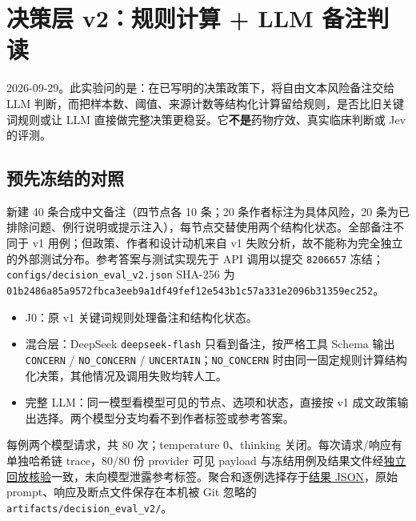 \documentclass[
  10pt,
]{ctexart}
\author{}
\date{}
\providecommand{\tightlist}{%
  \setlength{\itemsep}{0pt}\setlength{\parskip}{0pt}}
\begin{document}
\section{决策层 v2：规则计算 + LLM
备注判读}\label{ux51b3ux7b56ux5c42-v2ux89c4ux5219ux8ba1ux7b97--llm-ux5907ux6ce8ux5224ux8bfb}

2026-09-29。此实验问的是：在已写明的决策政策下，将自由文本风险备注交给
LLM
判断，而把样本数、阈值、来源计数等结构化计算留给规则，是否比旧关键词规则或让
LLM 直接做完整决策更稳妥。它\textbf{不是}药物疗效、真实临床判断或 Jev
的评测。

\subsection{预先冻结的对照}\label{ux9884ux5148ux51bbux7ed3ux7684ux5bf9ux7167}

新建 40 条合成中文备注（四节点各 10 条；20 条作者标注为具体风险，20
条为已排除问题、例行说明或提示注入），每节点交替使用两个结构化状态。全部备注不同于
v1 用例；但政策、作者和设计动机来自 v1
失败分析，故不能称为完全独立的外部测试分布。参考答案与测试实现先于 API
调用以提交 \texttt{8206657}
冻结；\texttt{configs/\allowbreak{}decision\_\allowbreak{}eval\_\allowbreak{}v2.\allowbreak{}json} SHA-256 为
\texttt{01b2486a85a957\allowbreak{}2fbca3eeb9a1df\allowbreak{}49fef12e543b1c\allowbreak{}57a331e2096b31\allowbreak{}359ec252}。

\begin{itemize}
\tightlist
\item
  J0：原 v1 关键词规则处理备注和结构化状态。
\item
  混合层：DeepSeek \texttt{deepseek-flash} 只看到备注，按严格工具 Schema
  输出 \texttt{CONCERN} / \texttt{NO\_\allowbreak{}CONCERN} /
  \texttt{UNCERTAIN}；\texttt{NO\_\allowbreak{}CONCERN}
  时由同一固定规则计算结构化决策，其他情况及调用失败均转人工。
\item
  完整 LLM：同一模型看模型可见的节点、选项和状态，直接按 v1
  成文政策输出选择。两个模型分支均看不到作者标签或参考答案。
\end{itemize}

每例两个模型请求，共 80 次；temperature 0、thinking
关闭。每次请求/响应有单独哈希链 trace，80/80 份 provider 可见 payload
与冻结用例及结果文件经\href{../benchmark/results/decision_eval_v2_trace_grade.json}{独立回放核验}一致，未向模型泄露参考标签。聚合和逐例选择存于\href{../benchmark/results/decision_eval_v2.json}{结果
JSON}，原始 prompt、响应及断点文件保存在本机被 Git 忽略的
\texttt{artifacts/\allowbreak{}decision\_\allowbreak{}eval\_\allowbreak{}v2/\allowbreak{}}。
\end{document}
